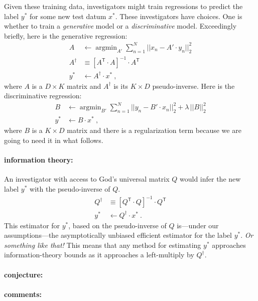 \documentclass[12pt]{article}
\newcommand{\T}{^{{\mathsf T}}}
\newcommand{\inv}{^{-1}}
\DeclareMathOperator*{\argmin}{argmin}
\begin{document}
Given these training data, investigators might train regressions to
predict the label $y^\ast$ for some new test datum $x^\ast$.
These investigators have choices.
One is whether to train a \emph{generative} model or a
\emph{discriminative} model.
Exceedingly briefly, here is the generative regression:
\begin{align}
A &\leftarrow \argmin_{A'} \sum_{n=1}^N ||x_n - A'\cdot y_n||_2^2 \\
A^\dagger &\equiv [A\T\cdot A]\inv \cdot A\T \\
y^\ast &\leftarrow A^\dagger\cdot x^\ast
~,
\end{align}
where $A$ is a $D\times K$ matrix and $A^\dagger$ is its $K\times D$
pseudo-inverse.
Here is the discriminative regression:
\begin{align}
B &\leftarrow \argmin_{B'} \sum_{n=1}^N ||y_n - B'\cdot x_n||_2^2 + \lambda\,||B||_2^2 \\
y^\ast &\leftarrow B\cdot x^\ast
~,
\end{align}
where $B$ is a $K\times D$ matrix and there is a regularization term
because we are going to need it in what follows.

\paragraph{information theory:}
An investigator with access to God's universal matrix $Q$ would infer
the new label $y^\ast$ with the pseudo-inverse of $Q$.
\begin{align}
Q^\dagger &\equiv [Q\T\cdot Q]\inv \cdot Q\T \\
y^\ast &\leftarrow Q^\dagger\cdot x^\ast
~.
\end{align}
This estimator for $y^\ast$, based on the pseudo-inverse of $Q$
is---under our assumptions---the asymptotically unbiased efficient
estimator for the label $y^\ast$. \emph{Or something like that!}
This means that any method for estimating $y^\ast$ approaches
information-theory bounds as it approaches a left-multiply by
$Q^\dagger$.

\paragraph{conjecture:}


\paragraph{comments:}
\end{document}
